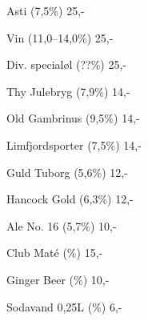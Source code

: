 \documentclass{article}
\begin{document}

\maketitle

\null
\vspace{-0.8cm}


\vspace{0.5cm}

Asti {\large (7,5\%)} \hfill 25,-

\vspace{0.3cm}

Vin {\large (11,0--14,0\%)} \hfill 25,-

\vspace{0.3cm}

Div. specialøl {\large (??\%)}  \hfill 25,-

\vspace{1.3cm}

Thy Julebryg {\large (7,9\%)} \hfill 14,-

\vspace{0.3cm}

Old Gambrinus {\large (9,5\%)}  \hfill 14,-

\vspace{0.3cm}

Limfjordsporter {\large (7,5\%)}  \hfill 14,-





\vspace{1.3cm}

Guld Tuborg {\large (5,6\%)} \hfill 12,-

\vspace{0.3cm}

Hancock Gold {\large (6,3\%)} \hfill 12,-

\vspace{0.3cm}

Ale No. 16 {\large (5,7\%)} \hfill 10,-

\vspace{1.3cm}

Club Maté {\large (\frownie{}\%)} \hfill 15,-

\vspace{0.3cm}

Ginger Beer {\large (\frownie{}\%)} \hfill 10,-

\vspace{0.3cm}

Sodavand 0,25L {\large (\frownie{}\%)}  \hfill 6,-

\vspace{0.5cm}

\underskriv
\end{document}
